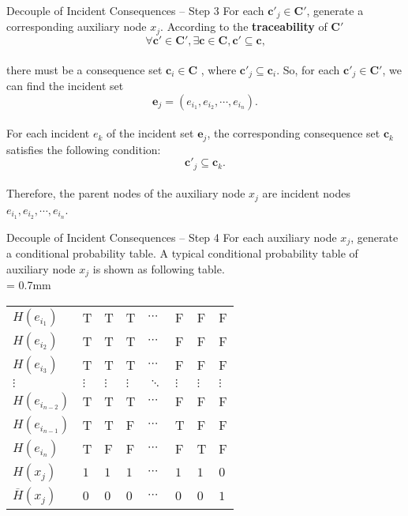 \begin{frame}{Decouple of Incident Consequences -- Step 3}
    \label{Dynamic Risk Assessment: Decouple of Incident Consequences Step 3}
    For each $\bm{c}'_j \in \bm{C}'$, generate a corresponding auxiliary node $x_j$. According to the \textbf{traceability} of $\bm{C}'$
    \[
    \forall \bm{c}' \in \bm{C}', \exists \bm{c} \in \bm{C}, \bm{c}' \subseteq \bm{c}\text{,}
    \]
    \vspace{-15pt}\\
    there must be a consequence set $\bm{c}_i \in \bm{C}$ , where $\bm{c}'_j \subseteq \bm{c}_i$. \pause So, for each $\bm{c}'_j \in \bm{C}'$, we can find the incident set
    \[
    \bm{e}_j = (e_{i_1},e_{i_2},\cdots,e_{i_n})\text{.}
    \]
    \vspace{-15pt}\\\pause
    For each incident $e_k$ of the incident set $\bm{e}_j$, the corresponding consequence set $\bm{c}_k$ satisfies the following condition:
    \[
    \bm{c}'_j \subseteq \bm{c}_k\text{.}
    \]
    \vspace{-15pt}\\\pause
    Therefore, the parent nodes of the auxiliary node $x_j$ are incident nodes $e_{i_1},e_{i_2},\cdots,e_{i_n}$.
\end{frame}

\begin{frame}{Decouple of Incident Consequences -- Step 4}
    \label{Dynamic Risk Assessment: Decouple of Incident Consequences Step 4}
    For each auxiliary node $x_j$, generate a conditional probability table. A typical conditional probability table of auxiliary node $x_j$ is shown as following table.\\[-15pt]
    \extrarowsep = 0.7mm
    \begin{center}
      \begin{tabu}to 
        $H(e_{i_1})$        & T & T & T & $\cdots$ & F & F & F\\
        $H(e_{i_2})$        & T & T & T & $\cdots$ & F & F & F\\
        $H(e_{i_3})$        & T & T & T & $\cdots$ & F & F & F\\
        $\vdots$            & $\vdots$ & $\vdots$ & $\vdots$ & $\ddots$ & $\vdots$ & $\vdots$ & $\vdots$\\
        $H(e_{i_{n-2}})$    & T & T & T & $\cdots$ & F & F & F\\
        $H(e_{i_{n-1}})$    & T & T & F & $\cdots$ & T & F & F\\
        $H(e_{i_n})$        & T & F & F & $\cdots$ & F & T & F\\
        \hline
        $H(x_j)$            & $1$ & $1$ & $1$ & $\cdots$ & $1$ & $1$ & $0$ \\
        $\overline{H}(x_j)$ & $0$ & $0$ & $0$ & $\cdots$ & $0$ & $0$ & $1$
      \end{tabu}
    \end{center}
\end{frame}

